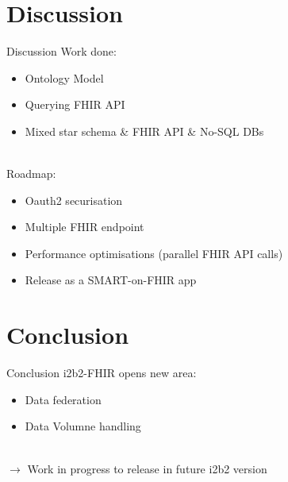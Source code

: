 \documentclass[10pt]{beamer}
\begin{document}
\section{Discussion}
\begin{frame}{Discussion}{}
Work done:
\begin{itemize}
\item Ontology Model
\item Querying FHIR API
\item Mixed star schema \& FHIR API \& No-SQL DBs
\end{itemize}
~
	\\
	Roadmap:
\begin{itemize}
\item Oauth2 securisation
\item Multiple FHIR endpoint 
\item Performance optimisations (parallel FHIR API calls)
\item Release as a SMART-on-FHIR app 
\end{itemize}
\end{frame}

\section{Conclusion}
\begin{frame}{Conclusion}{}
	i2b2-FHIR opens new area:
\begin{itemize}
\item Data federation
\item Data Volumne handling
\end{itemize}
~\\
$\rightarrow$ Work in progress to release in future i2b2 version
\end{frame}

{\1
\begin{frame}
\end{frame}}
\end{document}

